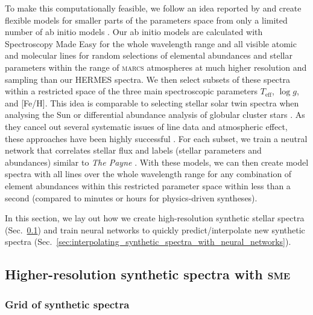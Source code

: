 \documentclass[
  journal=pasa,
  manuscript=research-paper, %
  year=2023,
  volume=37
]{cup-journal}
\newcommand{\Teff}{$T_\mathrm{eff}$\xspace}
\newcommand{\logg}{$\log g$\xspace}
\newcommand{\sme}{\textsc{sme}\xspace}
\begin{document}
To make this computationally feasible, we follow an idea reported by \citet{Rix2016} and create flexible models for smaller parts of the parameters space from only a limited number of ab initio models \citep[see also][]{Ting2016b}. Our ab initio models are calculated with Spectroscopy Made Easy \citep[\textsc{sme}][]{Valenti1996,Piskunov2017} for the whole wavelength range and all visible atomic and molecular lines for random selections of elemental abundances and stellar parameters within the range of \textsc{marcs} atmospheres \citep{Gustafsson2008} at much higher resolution and sampling than our HERMES spectra. We then select subsets of these spectra within a restricted space of the three main spectroscopic parameters \Teff, \logg, and [Fe/H]. This idea is comparable to selecting stellar solar twin spectra when analysing the Sun \citep[see e.g.]{Nissen2015} or differential abundance analysis of globular cluster stars \citep[e.g.][and Monty et al. in prep]{Yong2013}. As they cancel out several systematic issues of line data and atmospheric effect, these approaches have been highly successful \citep{Nissen2018}. For each subset, we train a neutral network that correlates stellar flux and labels (stellar parameters and abundances) similar to \textit{The Payne} \citep{Ting2019}. With these models, we can then create model spectra with all lines over the whole wavelength range for any combination of element abundances within this restricted parameter space within less than a second (compared to minutes or hours for physics-driven syntheses). 

In this section, we lay out how we create high-resolution synthetic stellar spectra (Sec.~\ref{sec:higher_resolution_synthetic_spectra}) and train neural networks to quickly predict/interpolate new synthetic spectra (Sec.~\ref{sec:interpolating_synthetic_spectra_with_neural_networks}).

\subsection{Higher-resolution synthetic spectra with \sme}
\label{sec:higher_resolution_synthetic_spectra}

\subsubsection{Grid of synthetic spectra} \label{subsubsec:spectrum_grid}
\end{document}
